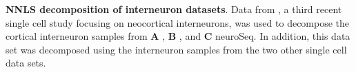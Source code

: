 \textbf{NNLS decomposition of interneuron datasets}. Data from \citep{Paul_2017}, a third recent single cell study focusing on neocortical interneurons, was used to decompose the cortical interneuron samples from \textbf{A} \citep{Tasic_2018}, \textbf{B} \citep{Zeisel_2018}, and \textbf{C}  neuroSeq. In addition, this data set was decomposed using the interneuron samples from the two other single cell data sets.